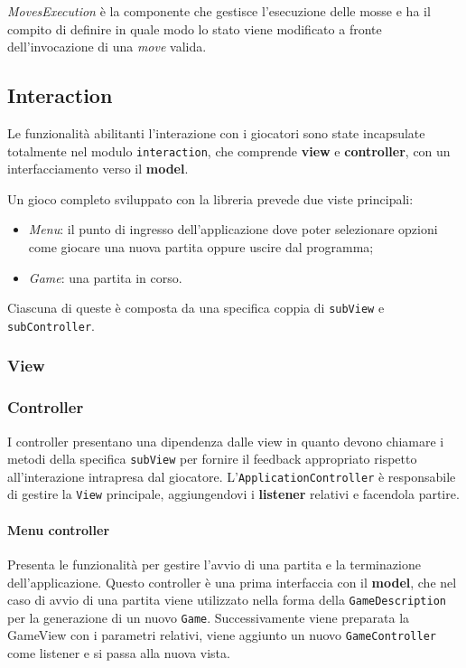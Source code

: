 \textit{MovesExecution} è la componente che gestisce l'esecuzione delle mosse e ha il compito di definire in quale modo lo stato viene modificato a fronte dell'invocazione di una \textit{move} valida.

\subsection{Interaction}

Le funzionalità abilitanti l'interazione con i giocatori sono state incapsulate totalmente nel modulo \texttt{interaction}, che comprende \textbf{view} e \textbf{controller}, con un interfacciamento verso il \textbf{model}.

Un gioco completo sviluppato con la libreria prevede due viste principali:
\begin{itemize}
    \item \textit{Menu}: il punto di ingresso dell'applicazione dove poter selezionare opzioni come giocare una nuova partita oppure uscire dal programma;
    \item \textit{Game}: una partita in corso.
\end{itemize}
%
Ciascuna di queste è composta da una specifica coppia di \texttt{subView} e \texttt{subController}.
%

\subsubsection{View}
\subsubsection{Controller}
I controller presentano una dipendenza dalle view in quanto devono chiamare i metodi della specifica \texttt{subView} per fornire il feedback appropriato rispetto all'interazione intrapresa dal giocatore.
%
L'\texttt{ApplicationController} è responsabile di gestire la \texttt{View} principale, aggiungendovi i \textbf{listener} relativi e facendola partire.
\paragraph{Menu controller}
%
Presenta le funzionalità per gestire l'avvio di una partita e la terminazione dell'applicazione.
%
Questo controller è una prima interfaccia con il \textbf{model}, che nel caso di avvio di una partita viene utilizzato nella forma della \texttt{GameDescription} per la generazione di un nuovo \texttt{Game}.
%
Successivamente viene preparata la GameView con i parametri relativi, viene aggiunto un nuovo \texttt{GameController} come listener e si passa alla nuova vista.
